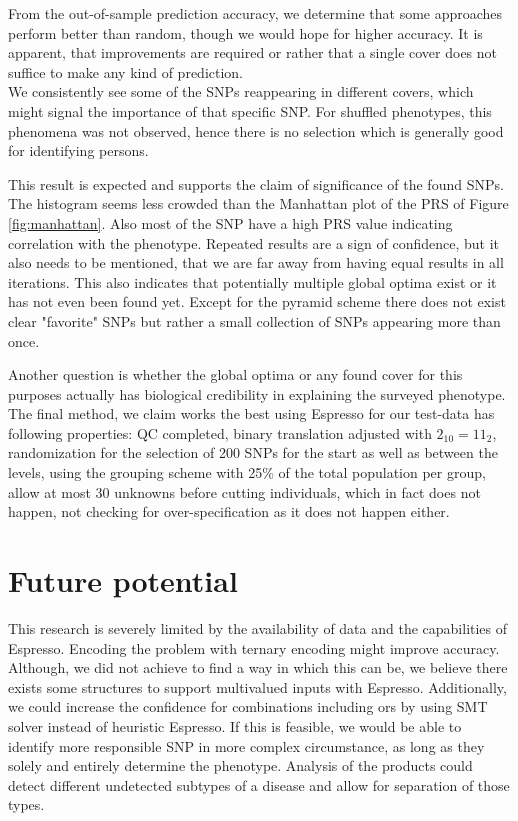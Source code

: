\documentclass[letterpaper, 11pt]{article}
\begin{document}
From the out-of-sample prediction accuracy, we determine that some approaches perform better than random, though we would hope for higher accuracy. It is apparent, that improvements are required or rather that a single cover does not suffice to make any kind of prediction.\\

We consistently see some of the SNPs reappearing in different covers, which might signal the importance of that specific SNP. For shuffled phenotypes, this phenomena was not observed, hence there is no selection which is generally good for identifying persons. 

This result is expected and supports the claim of significance of the found SNPs.\\

The histogram seems less crowded than the Manhattan plot of the PRS of Figure \ref{fig:manhattan}. Also most of the SNP have a high PRS value indicating correlation with the phenotype. Repeated results are a sign of confidence, but it also needs to be mentioned, that we are far away from having equal results in all iterations. This also indicates that potentially multiple global optima exist or it has not even been found yet.  Except for  the pyramid scheme there does not exist clear "favorite" SNPs but rather a small collection of SNPs appearing more than once.

Another question is whether the global optima or any found cover for this purposes actually has biological credibility in explaining the surveyed phenotype. \\

The final method, we claim works the best using Espresso for our test-data has following properties: QC completed, binary translation adjusted with $2_{10}=11_2$, randomization for the selection of 200 SNPs for the start as well as between the levels, using the grouping scheme with 25\% of the total population per group, allow at most 30 unknowns before cutting individuals, which in fact does not happen, not checking for over-specification as it does not happen either. 
\section{Future potential}%
This research is severely limited by the availability of data and the capabilities of Espresso. Encoding the problem with ternary encoding might improve accuracy. Although, we did not achieve to find a way in which this can be, we believe there exists some structures to support  multivalued inputs with Espresso. Additionally, we could increase the confidence for combinations including ors by using SMT solver instead of heuristic Espresso. If this is feasible, we would be able to identify more responsible SNP in more complex circumstance, as long as they solely and entirely determine the phenotype. Analysis of the products could detect different undetected subtypes of a disease and allow for separation of those types.  \\
\end{document}
